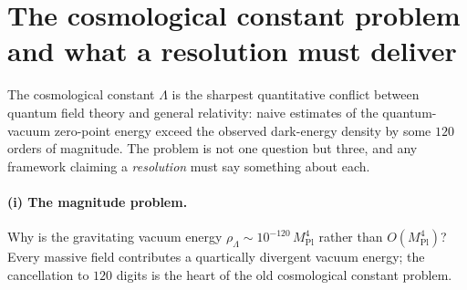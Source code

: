 \documentclass[11pt,a4paper]{article}
\theoremstyle{plain}
\theoremstyle{definition}
\theoremstyle{remark}
\newcommand{\Ok}{\Omega_K}
\newcommand{\OL}{\Omega_\Lambda}
\newcommand{\ag}{a_\gamma}
\newcommand{\Mpl}{M_{\mathrm{Pl}}}
\begin{document}
\begin{abstract}
Newton constant, and no Planck mass. We give the rigorous spectral backbone in full: twelve
proven spectral results (R1--R12), the Burghelea--Friedlander--Kappeler gluing identity, the
cap-variational saddle and its stability in every sector, the higher-loop convergence bound,
and an independent recomputation (M1) with exact symbolic and numerical methods. Every step
carries an explicit status --- \emph{proven}, \emph{literature-supported}, \emph{calibrated},
or \emph{open}. After decomposition, the framework reduces to a single genuinely chosen
element --- the data-anchored reference state A5c --- plus the embedding into the full
infinite-dimensional no-boundary path integral (the two-dimensional cap-plus-scalar embedding
$B1'$ being complete, $n_{\mathrm{complex}}=0$ by polynomial reduction); its
topological core (the ratio A5a, the self-consistency fixed point A2, cap dominance B1 on the
reduced action) is theorem-level, and the open sign is forced by the positive photon anomaly coefficient $\ag>0$ \emph{within the Hartle--Hawking branch} (the branch selection itself a postulate).
The prediction is
sharply falsifiable: a robust $\Ok$ outside $\pm 3\sigma$ of $\ag\OL/(8\pi^2)$, or a robust
detection of a closed universe, would refute the framework as stated.
\end{abstract}

\tableofcontents
\bigskip

\section{The cosmological constant problem and what a resolution must deliver}
\label{sec:intro}

The cosmological constant $\Lambda$ is the sharpest quantitative conflict between quantum field
theory and general relativity: naive estimates of the quantum-vacuum zero-point energy exceed the
observed dark-energy density by some $120$ orders of magnitude. The problem is not one question but three, and any framework claiming a
\emph{resolution} must say something about each.

\paragraph{(i) The magnitude problem.} Why is the gravitating vacuum energy
$\rho_\Lambda \sim 10^{-120}\,\Mpl^4$ rather than $O(\Mpl^4)$? Every massive field contributes
a quartically divergent vacuum energy; the cancellation to $120$ digits is the heart of the
old cosmological constant problem.
\end{document}
